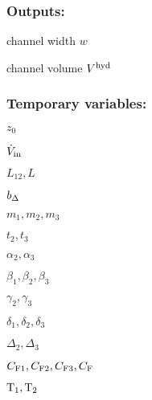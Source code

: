 \subsubsection*{Outputs:}
\begin{multicols}{3}
  \begin{packed_item}
    \item channel width $w$
    \item channel volume $V^\text{hyd}$
  \end{packed_item}
\end{multicols}

\subsubsection*{Temporary variables:}
\begin{multicols}{3}
  \begin{packed_item}
  \item $z_0$
  \item $\dot{V}_\text{in}$
  \item $L_{12}, L$  
  \item $b_\Delta$
  \item $m_1, m_2, m_3$
  \item $t_2, t_3$
  \item $α_2, α_3$
  \item $β_1, β_2, β_3$
  \item $γ_2, γ_3$
  \item $δ_1, δ_2, δ_3$
  \item $Δ_2, Δ_3$
  \item $C_\text{F1}, C_\text{F2}, C_\text{F3}, C_\text{F}$
 \item $\text{T}_{1}, \text{T}_{2}$
  \end{packed_item}
\end{multicols}
